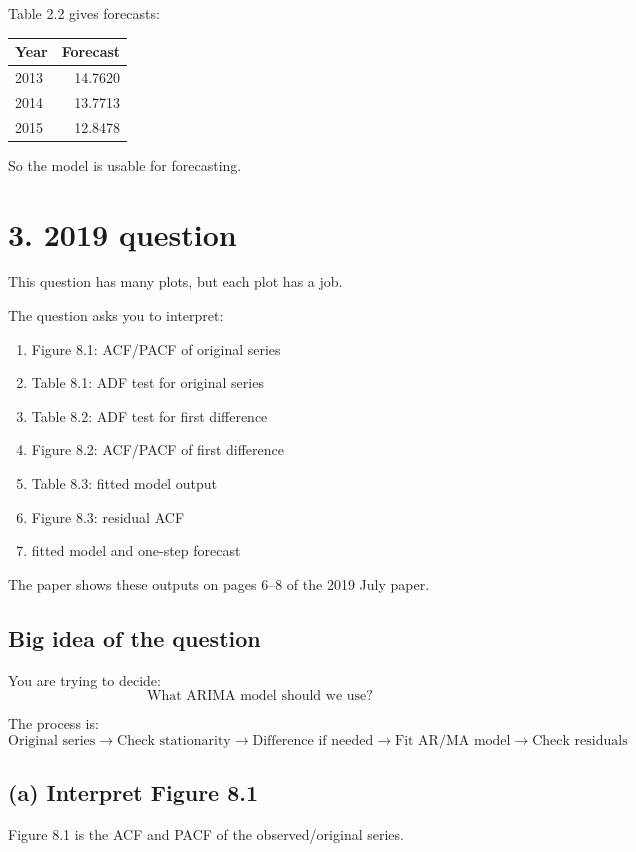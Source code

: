 \documentclass[11pt]{article}
\begin{document}
Table 2.2 gives forecasts:

\begin{center}
\begin{tabular}{@{}lr@{}}
\toprule
Year & Forecast \\
\midrule
2013 & 14.7620 \\
2014 & 13.7713 \\
2015 & 12.8478 \\
\bottomrule
\end{tabular}
\end{center}

So the model is usable for forecasting.

\section*{3. 2019 question}
This question has many plots, but each plot has a job.

The question asks you to interpret:
\begin{enumerate}
  \item Figure 8.1: ACF/PACF of original series
  \item Table 8.1: ADF test for original series
  \item Table 8.2: ADF test for first difference
  \item Figure 8.2: ACF/PACF of first difference
  \item Table 8.3: fitted model output
  \item Figure 8.3: residual ACF
  \item fitted model and one-step forecast
\end{enumerate}

The paper shows these outputs on pages 6--8 of the 2019 July paper.

\subsection*{Big idea of the question}
You are trying to decide:
\[
\text{What ARIMA model should we use?}
\]

The process is:
\[
\text{Original series} \rightarrow \text{Check stationarity} \rightarrow \text{Difference if needed} \rightarrow \text{Fit AR/MA model} \rightarrow \text{Check residuals}
\]

\subsection*{(a) Interpret Figure 8.1}
Figure 8.1 is the ACF and PACF of the observed/original series.
\end{document}
